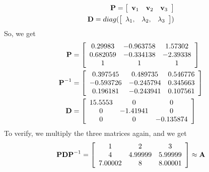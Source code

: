 \documentclass[12pt, a4paper]{article}
\begin{document}
\begin{align*}
    \textbf{P} = \left[ {\begin{array}{ccc}
        \textbf{v}_1 & \textbf{v}_2 & \textbf{v}_3
    \end{array} } \right] \\
    \textbf{D} = diag(\left[ {\begin{array}{ccc}
        \lambda_1 ,& \lambda_2 ,& \lambda_3
    \end{array} } \right])
\end{align*}
So, we get
\begin{align*}
    \textbf{P} &= \left[ {\begin{array}{ccc}
        0.29983 & -0.963758 & 1.57302 \\
        0.682059 & -0.334138 & -2.39338 \\
        1 & 1 & 1 \\
    \end{array} } \right] \\
    \textbf{P}^{-1} &= \left[ {\begin{array}{ccc}
        0.397545 & 0.489735 & 0.546776 \\
        -0.593726 & -0.245794 & 0.345663 \\
        0.196181 & -0.243941 & 0.107561 \\
    \end{array} } \right] \\
    \textbf{D} &= \left[ {\begin{array}{ccc}
        15.5553 & 0 & 0 \\
        0 & -1.41941 & 0 \\
        0 & 0 & -0.135874 \\
    \end{array} } \right] \\
\end{align*}
To verify, we multiply the three matrices again, and we get
\begin{align*}
\textbf{P} \textbf{D} \textbf{P}^{-1}
    &= \left[ {\begin{array}{ccc}
        1 &  2 &  3 \\
        4 &  4.99999 &  5.99999 \\
        7.00002 &  8 &  8.00001 \\
    \end{array} } \right] \approx \textbf{A}\\
\end{align*}

\newpage
\end{document}

